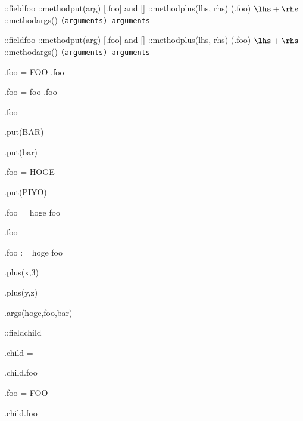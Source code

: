 \documentclass{jarticle}
\begin{document}
\def\describe#1{\texttt{(#1) \expandafter\meaning\csname #1\endcsname}}

\def\myclass#1{
  \def#1{}
  \object::field#1{foo}
  \object::method#1put(arg) {
    [\this.foo] and [\arg]
  }
  \object::method#1plus(lhs, rhs) {
    (\this.foo) $\lhs+\rhs$
  }
  \object::method#1args() {
    \describe{arguments}
  }
}

\myclass\obj
\myclass\obk

\obj.foo = {FOO}
\obj.foo

\obk.foo = {foo}
\obk.foo

\obj.foo

\obj.put(BAR)

\obk.put(bar)

\obj.foo = {HOGE}

\obj.put(PIYO)

\def\tmp{hoge foo}

\obj.foo = \tmp

\obj.foo

\obj.foo := \tmp

\obj.plus(x,3)

\obk.plus(y,z)

\obj.args(hoge,foo,bar)

\object::field\obj{child}

\obj.child = \obk

\obj.child.foo

\obk.foo = {FOO}

\obj.child.foo
\end{document}
